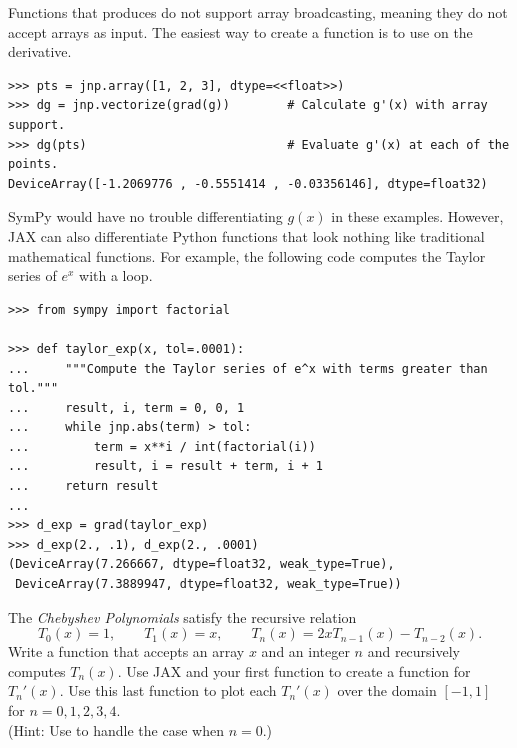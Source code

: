 Functions that  produces do not support array broadcasting, meaning they do not accept arrays as input.
The easiest way to create a function is to use  on the derivative.

\begin{lstlisting}
>>> pts = jnp.array([1, 2, 3], dtype=<<float>>)
>>> dg = jnp.vectorize(grad(g))        # Calculate g'(x) with array support.
>>> dg(pts)                            # Evaluate g'(x) at each of the points.
DeviceArray([-1.2069776 , -0.5551414 , -0.03356146], dtype=float32)
\end{lstlisting}



SymPy would have no trouble differentiating $g(x)$ in these examples.
However, JAX can also differentiate Python functions that look nothing like traditional mathematical functions.
For example, the following code computes the Taylor series of $e^{x}$ with a loop.

\begin{lstlisting}
>>> from sympy import factorial

>>> def taylor_exp(x, tol=.0001):
...     """Compute the Taylor series of e^x with terms greater than tol."""
...     result, i, term = 0, 0, 1
...     while jnp.abs(term) > tol:
...         term = x**i / int(factorial(i))
...         result, i = result + term, i + 1
...     return result
...
>>> d_exp = grad(taylor_exp)
>>> d_exp(2., .1), d_exp(2., .0001)
(DeviceArray(7.266667, dtype=float32, weak_type=True),
 DeviceArray(7.3889947, dtype=float32, weak_type=True))
\end{lstlisting}

\begin{problem} %
The \emph{Chebyshev Polynomials} satisfy the recursive relation
\[
T_0(x) = 1,\qquad T_1(x) = x,\qquad T_n(x) = 2xT_{n-1}(x) - T_{n-2}(x).
\]
Write a function that accepts an array $x$ and an integer $n$ and recursively computes $T_n(x)$.
Use JAX and your first function to create a function for $T_n'(x)$.
Use this last function to plot each $T_n'(x)$ over the domain $[-1, 1]$ for $n=0,1,2,3,4$.
\\(Hint: Use  to handle the case when $n = 0$.)
\end{problem}

